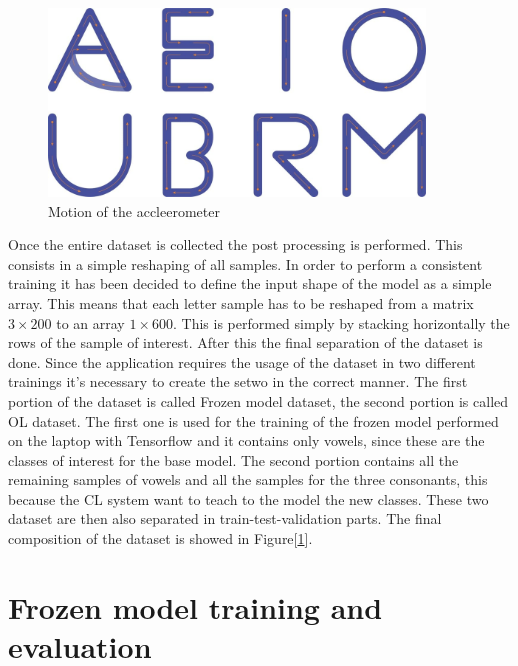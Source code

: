 \documentclass[12pt]{report}
\begin{document}
\begin{figure}[h!]
    \centering
    \includegraphics[width=100mm]{Figures/Chapter4/letters_motion.jpg} 
    \caption{Motion of the accleerometer}
    \label{fig:letters_motion}    
\end{figure}

Once the entire dataset is collected the post processing is performed. This consists in a simple reshaping of all samples. In order to perform a consistent training it has been decided to define the input shape of the model as a simple array. This means that each letter sample has to be reshaped from a matrix  $3 \times 200$ to an array $1 \times 600$. This is performed simply by stacking horizontally the rows of the sample of interest. After this the final separation of the dataset is done. Since the application requires the usage of the dataset in two different trainings it's necessary to create the setwo in the correct manner. The first portion of the dataset is called Frozen model dataset, the second portion is called OL dataset. The first one is used for the training of the frozen model performed on the laptop with Tensorflow and it contains only vowels, since these are the classes of interest for the base model. The second portion contains all the remaining samples of vowels and all the samples for the three consonants, this because the CL system want to teach to the model the new classes. These two dataset are then also separated in train-test-validation parts. The final composition of the dataset is showed in Figure[\ref{}].


\section{Frozen model training and evaluation}
\end{document}
